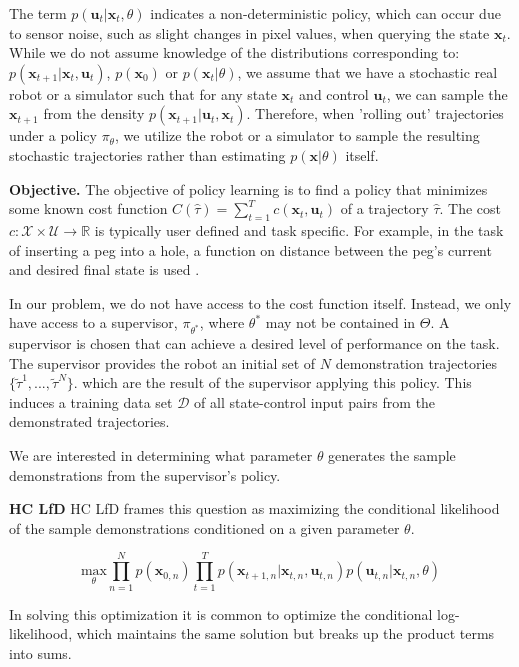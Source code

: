 \documentclass[10pt, conference]{ieeeconf}      %
\newcommand{\bu}{\mathbf{u}}
\newcommand{\bx}{\mathbf{x}}
\newcommand{\ns}{HC LfD }
\begin{document}
The term $p(\bu_t|\bx_t,\theta)$ indicates a non-deterministic policy, which can occur due to sensor noise, such as slight changes in pixel values, when querying the state $\bx_t$. While we do not assume knowledge of the distributions corresponding to: $p(\bx_{t+1}|\bx_t,\bu_t)$, $p(\bx_0)$ or $p(\bx_t|
\theta)$, we assume that we have a stochastic real robot or a simulator such that for any state
$\bx_t$ and control $\bu_t$, we can sample the $\bx_{t+1}$ from the density $p(\bx_{t+1}|\bu_t,\bx_t)$. 
Therefore, when 'rolling out' trajectories under a policy
$\pi_{\theta}$, we utilize the robot or a simulator to sample the resulting stochastic trajectories rather than
estimating $p(\bx|\theta)$ itself.


\noindent\textbf{Objective.} The objective of policy learning is to find a policy that minimizes some known cost function $C(\hat{\tau}) = \sum^T_{t=1} c(\bx_t,\bu_t)$ of a trajectory $\hat{\tau}$. The cost $c:\mathcal{X}\times \mathcal{U}\to \mathbb{R}$ is typically user defined and task specific. 
For example, in the task of inserting a peg into a hole, a function on distance between the peg's current and desired final state is used \cite{levine2015end}.  


In our problem, we do not have access to the cost function itself. Instead, we only have access to 
a supervisor, $\pi_{\theta^*}$, where $\theta^*$ may not be contained in $\Theta$. A supervisor is chosen that can achieve a desired level of performance on the task. The supervisor provides the robot an initial set
of $N$   demonstration trajectories $\lbrace \tilde{\tau}^1,...,\tilde{\tau}^N \rbrace$. 
which are the result of the supervisor applying this policy. This induces a training data set $\mathcal{D}$ of all state-control input pairs from the demonstrated trajectories.

We are interested in determining what parameter $\theta$ generates the sample demonstrations from the supervisor's policy. 

\noindent \textbf{\ns} \ns frames this  question as maximizing the conditional likelihood of the sample demonstrations conditioned on a given parameter $\theta$. 

$$\underset{\theta}{\mbox{max}} \prod^N_{n=1} p(\bx_{0,n}) \prod^T_{t=1} p(\bx_{t+1,n}|\bx_{t,n},\bu_{t,n})p(\bu_{t,n}|\bx_{t,n},\theta)$$

In solving this optimization it is common to optimize the conditional log-likelihood, which maintains the same solution but breaks up the product terms into sums. 
\end{document}
